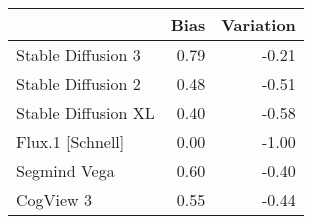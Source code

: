 \begin{tabular}{lrr}
\toprule
 & Bias & Variation \\
\midrule
Stable Diffusion 3 & 0.79 & -0.21 \\
Stable Diffusion 2 & 0.48 & -0.51 \\
Stable Diffusion XL & 0.40 & -0.58 \\
Flux.1 [Schnell] & 0.00 & -1.00 \\
Segmind Vega & 0.60 & -0.40 \\
CogView 3 & 0.55 & -0.44 \\
\bottomrule
\end{tabular}
